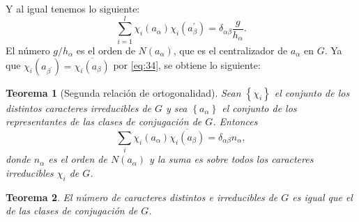 \documentclass[12pt]{book}
\newtheorem{theorem}{Teorema}[section]
\theoremstyle{definition}
\newcounter{in}
\begin{document}
Y al igual tenemos lo siguiente:
\begin{equation}
  \label{eq:55}
   \sum_{i=1}^{l} \chi_{i}(a_{\alpha}) \chi_{i}(a_{\beta}^{'})=\delta_{\alpha \beta} \frac{g}{h_{\alpha}}.
\end{equation}
El número $g/h_{\alpha}$ es el orden de $N(a_{\alpha})$, que es el
centralizador de $a_{\alpha}$ en $G$. Ya que
$\chi_{i}(a_{\beta^{'}})=\overline{\chi_{i} (a_{\beta})}$ por
\ref{eq:34}, se obtiene lo siguiente:
\begin{theorem}[Segunda relación de ortogonalidad]
  \label{t4_9}
  Sean $\left\{\chi_{i} \right\}$ el conjunto de los distintos
  caracteres irreducibles de $G$ y sea $\left\{a_{\alpha} \right\}$ el
  conjunto de los representantes de las clases de conjugación de
  $G$. Entonces
\begin{equation*}
  \sum_{i} \chi_{i}(a_{\alpha}) \overline{\chi_{i} (a_{\beta})} = \delta_{\alpha \beta} n_{\alpha},
\end{equation*}
donde $n_{\alpha}$ es el orden de $N(a_{\alpha})$ y la suma es sobre
todos los caracteres irreducibles $\chi_{i}$ de $G$.
\end{theorem}
\begin{theorem}
  \label{t4_10}
  El número de caracteres distintos e irreducibles de $G$ es
  igual que el de las clases de conjugación de $G$.
\end{theorem}
\end{document}
